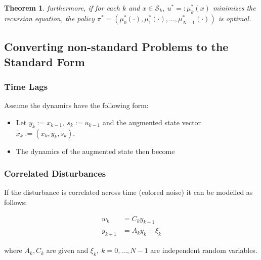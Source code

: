 \documentclass[10pt,a4paper]{scrartcl}
\newtheorem{theorem}{Theorem}
\begin{document}
\begin{multicols*}{2}
\begin{theorem}
furthermore, if for each $k$ and $x\in\mathcal{S}_k,\ u^\ast=:\mu_k^\ast(x)$ minimizes the recursion equation, the policy $\pi^\ast=(\mu_0^\ast(\cdot),\mu_1^\ast(\cdot),\ldots,\mu_{N-1}^\ast(\cdot))$ is optimal.
\end{theorem}

\subsection{Converting non-standard Problems to the Standard Form}

\subsubsection{Time Lags}

Assume the dynamics have the following form:


\begin{itemize}
\item Let $y_k:=x_{k-1},\ s_k:=u_{k-1}$ and the augmented state vector $\tilde{x}_k:=(x_k,y_k,s_k)$.
\item The dynamics of the augmented state then become

\end{itemize}

\subsubsection{Correlated Disturbances}

If the disturbance is correlated across time (colored noise) it can be modelled as follows:

\begin{align*}
w_k&=C_ky_{k+1}\\
y_{k+1}&=A_ky_k+\xi_k
\end{align*}

where $A_k,C_k$ are given and $\xi_k,\ k=0,\ldots,N-1$ are independent random variables.


\end{multicols*}
\end{document}
